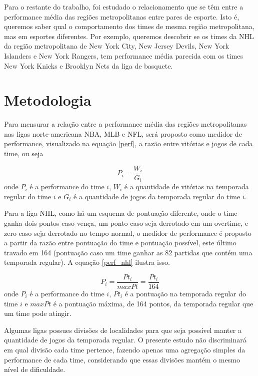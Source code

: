 \documentclass[12pt,oneside,a4paper,chapter=TITLE,english,brazil,sumario=abnt-6027-2012]{abntex2}
\begin{document}
	Para o restante do trabalho, foi estudado o relacionamento que se têm entre a performance média das regiões metropolitanas entre pares de esporte. Isto é, queremos saber qual o comportamento dos times de mesma região metropolitana, mas em esportes diferentes. Por exemplo, queremos descobrir se os times da NHL da região metropolitana de New York City, New Jersey Devils, New York Islanders e New York Rangers, tem performance média parecida com os times New York Knicks e Brooklyn Nets da liga de basquete.
	


\chapter{Metodologia}

	Para mensurar a relação entre a performance média das regiões metropolitanas nas ligas norte-americana NBA, MLB e NFL, será proposto como medidor de performance, visualizado na equação \ref{perf}, a razão entre vitórias e jogos de cada time, ou seja
	
	\begin{equation}
		P_i = \frac{W_i}{G_i}
		\label{perf}
	\end{equation}
	onde $P_i$ é a performance do time $i$, $W_i$ é a quantidade de vitórias na temporada regular do time $i$ e $G_i$ é a quantidade de jogos da temporada regular do time $i$.
	
	Para a liga NHL, como há um esquema de pontuação diferente, onde o time ganha dois pontos caso vença, um ponto caso seja derrotado em um overtime, e zero caso seja derrotado no tempo normal, o medidor de performance é proposto a partir da razão entre pontuação do time e pontuação possível, este último travado em 164 (pontuação caso um time ganhar as 82 partidas que contém uma temporada regular). A equação \ref{perf_nhl} ilustra isso.
	
	\begin{equation}
		P_i = \frac{Pt_i}{maxPt} = \frac{Pt_i}{164}
		\label{perf_nhl}
	\end{equation}
	onde $P_i$ é a performance do time $i$, $Pt_i$ é a pontuação na temporada regular do time $i$ e $maxPt$ é a pontuação máxima, de 164 pontos, da temporada regular que um time pode atingir.
	
	Algumas ligas possues divisões de localidades para que seja possível manter a quantidade de jogos da temporada regular. O presente estudo não discriminará em qual divisão cada time pertence, fazendo apenas uma agregação simples da performance de cada time, considerando que essas divisões mantém o mesmo nível de dificuldade.
	
\end{document}
